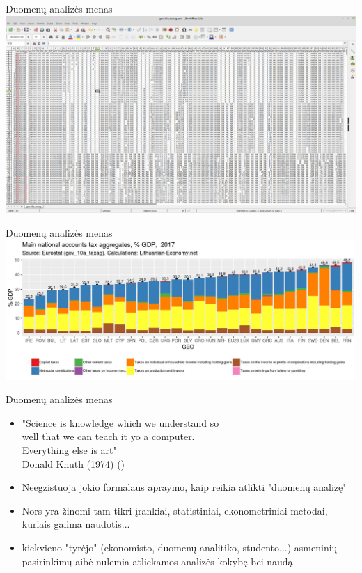 \documentclass[11pt,xcolor=table]{beamer}
\begin{document}

\begin{frame}{Duomenų analizės menas}
\includegraphics[scale=0.17]{raw_data.png}
\end{frame}


\begin{frame}{Duomenų analizės menas}
\includegraphics[scale=0.45]{Tax_GDP_2017_EU.jpeg}
\end{frame}


\begin{frame}{Duomenų analizės menas}
\begin{itemize}
\item "Science is knowledge which we understand so 
\\well that we can teach it yo a computer. 
\\ Everything else is art" 
\\Donald Knuth (1974) (\href{http://www.paulgraham.com/knuth.html}{\color{blue}{Knuth: Computer Programming as an Art}})
\item Neegzistuoja jokio formalaus apraymo, kaip reikia atlikti "duomenų analizę"
\item Nors yra žinomi tam tikri įrankiai, statistiniai, ekonometriniai metodai, kuriais galima naudotis...
\item kiekvieno "tyrėjo" (ekonomisto, duomenų analitiko, studento...) asmeninių pasirinkimų aibė nulemia atliekamos analizės kokybę bei naudą
\end{itemize}
\end{frame}
\end{document}
